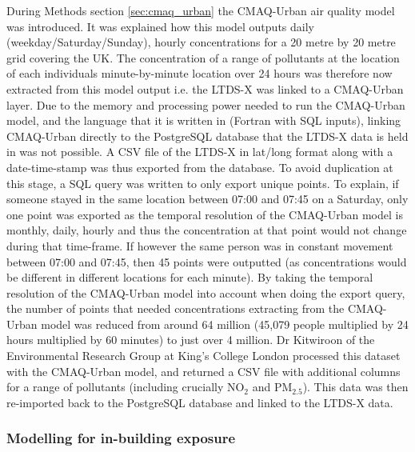 During Methods section \ref{sec:cmaq_urban} the CMAQ-Urban air quality model was introduced. It was explained how this model outputs daily (weekday/Saturday/Sunday), hourly concentrations for a 20 metre by 20 metre grid covering the UK. The concentration of a range of pollutants at the location of each individuals minute-by-minute location over 24 hours was therefore now extracted from this model output i.e. the LTDS-X was linked to a CMAQ-Urban layer. Due to the memory and processing power needed to run the CMAQ-Urban model, and the language that it is written in (Fortran with SQL inputs), linking CMAQ-Urban directly to the PostgreSQL database that the LTDS-X data is held in was not possible. A CSV file of the LTDS-X in lat/long format along with a date-time-stamp was thus exported from the database. To avoid duplication at this stage, a SQL query was written to only export unique points. To explain, if someone stayed in the same location between 07:00 and 07:45 on a Saturday, only one point was exported as the temporal resolution of the CMAQ-Urban model is monthly, daily, hourly and thus the concentration at that point would not change during that time-frame. If however the same person was in constant movement between 07:00 and 07:45, then 45 points were outputted (as concentrations would be different in different locations for each minute). By taking the temporal resolution of the CMAQ-Urban model into account when doing the export query, the number of points that needed concentrations extracting from the CMAQ-Urban model was reduced from around 64 million (45,079 people multiplied by 24 hours multiplied by 60 minutes) to just over 4 million. Dr Kitwiroon of the Environmental Research Group at King's College London processed this dataset with the CMAQ-Urban model, and returned a CSV file with additional columns for a range of pollutants (including crucially NO$_{2}$ and PM$_{2.5}$). This data was then re-imported back to the PostgreSQL database and linked to the LTDS-X data.

        \subsubsection{Modelling for in-building exposure}
        \label{sec:modelling_in_building}

